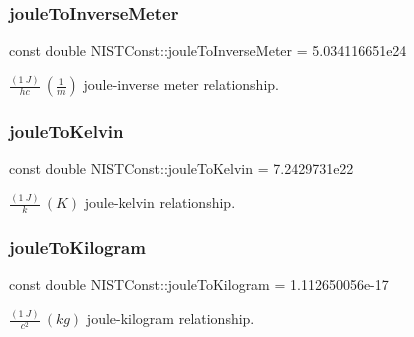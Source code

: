 \subsubsection{\texorpdfstring{joule\+To\+Inverse\+Meter}{jouleToInverseMeter}}
{\footnotesize\ttfamily const double N\+I\+S\+T\+Const\+::joule\+To\+Inverse\+Meter = 5.\+034116651e24}

$\frac{(1\ J)}{hc} \ (\frac{1}{m})$ joule-\/inverse meter relationship. \mbox{\label{group___n_i_s_t_const-_joule_ga506f23a4b88678bd7ee6f1067e97aa83}} 
\subsubsection{\texorpdfstring{joule\+To\+Kelvin}{jouleToKelvin}}
{\footnotesize\ttfamily const double N\+I\+S\+T\+Const\+::joule\+To\+Kelvin = 7.\+2429731e22}

$\frac{(1\ J)}{k} \ (K)$ joule-\/kelvin relationship. \mbox{\label{group___n_i_s_t_const-_joule_ga250f161277a6e581e695dccb7c11d1fb}} 
\subsubsection{\texorpdfstring{joule\+To\+Kilogram}{jouleToKilogram}}
{\footnotesize\ttfamily const double N\+I\+S\+T\+Const\+::joule\+To\+Kilogram = 1.\+112650056e-\/17}

$\frac{(1\ J)}{c^2} \ (kg)$ joule-\/kilogram relationship. 